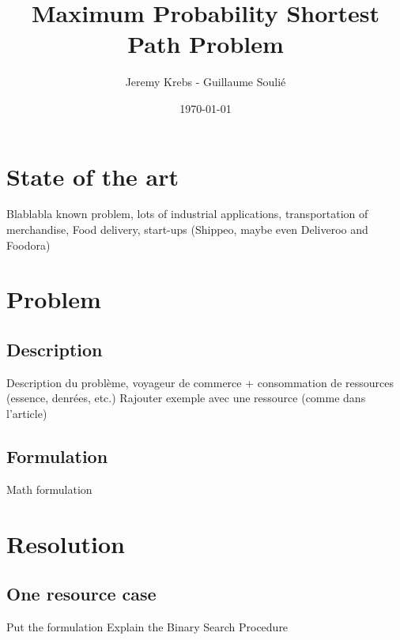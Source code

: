 \documentclass{beamer}
\title{Maximum Probability Shortest Path Problem}
\author{Jeremy Krebs - Guillaume Soulié}
\institute{Université Paris Saclay}
\date{\today}
\begin{document}
\begin{frame}
\titlepage
\end{frame}

\begin{frame}
  \tableofcontents
\end{frame}      


\section{State of the art}

\begin{frame}
Blablabla known problem, lots of industrial applications, transportation of merchandise, Food delivery, start-ups (Shippeo, maybe even Deliveroo and Foodora)
\end{frame}



\section{Problem}
\subsection{Description}

\begin{frame}
Description du problème, voyageur de commerce + consommation de ressources (essence, denrées, etc.)
Rajouter exemple avec une ressource (comme dans l'article)
\end{frame}

\subsection{Formulation}
\begin{frame}
Math formulation
\end{frame}

\section{Resolution}
\subsection{One resource case}
\begin{frame}
Put the formulation
Explain the Binary Search Procedure
\end{frame}
\end{document}
